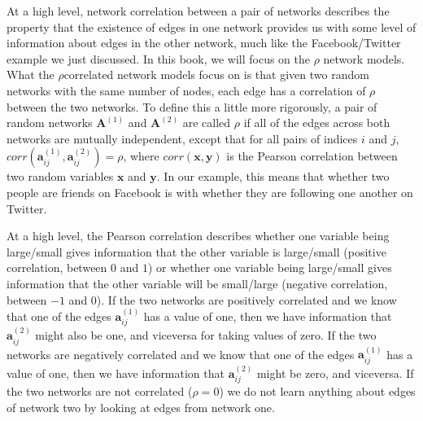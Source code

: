 \documentclass[letterpaper,10pt,english]{jupyterBook}
\begin{document}
\sphinxAtStartPar
At a high level, network correlation between a pair of networks describes the property that the existence of edges in one network provides us with some level of information about edges in the other network, much like the Facebook/Twitter example we just discussed. In this book, we will focus on the \(\rho\)\sphinxhyphen{} network models. What the \(\rho\)\sphinxhyphen{}correlated network models focus on is that given two random networks with the same number of nodes, each edge has a correlation of \(\rho\) between the two networks. To define this a little more rigorously, a pair of random networks \(\mathbf A^{(1)}\) and \(\mathbf A^{(2)}\) are called \(\rho\)\sphinxhyphen{} if all of the edges across both networks are mutually independent, except that for all pairs of indices \(i\) and \(j\), \(corr(\mathbf a_{ij}^{(1)}, \mathbf a_{ij}^{(2)}) = \rho\), where \(corr(\mathbf x, \mathbf y)\) is the Pearson correlation between two random variables \(\mathbf x\) and \(\mathbf y\). In our example, this means that whether two people are friends on Facebook is  with whether they are following one another on Twitter.

\sphinxAtStartPar
At a high level, the Pearson correlation describes whether one variable being large/small gives information that the other variable is large/small (positive correlation, between \(0\) and \(1\)) or whether one variable being large/small gives information that the other variable will be small/large (negative correlation, between \(-1\) and \(0\)). If the two networks are positively correlated and we know that one of the edges \(\mathbf a_{ij}^{(1)}\) has a value of one, then we have information that \(\mathbf a_{ij}^{(2)}\) might also be one, and vice\sphinxhyphen{}versa for taking values of zero. If the two networks are negatively correlated and we know that one of the edges \(\mathbf a_{ij}^{(1)}\) has a value of one, then we have information that \(\mathbf a_{ij}^{(2)}\) might be zero, and vice\sphinxhyphen{}versa. If the two networks are not correlated (\(\rho = 0\)) we do not learn anything about edges of network two by looking at edges from network one.
\end{document}
